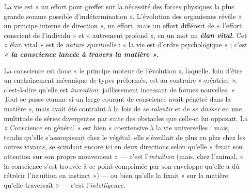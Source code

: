 La vie est « un effort pour greffer sur la nécessité des forces physiques
la plus grande somme possible d’indétermination ». L'évolution des
organismes révèle « un principe interne de direction », un effort, mais
un effort différent de « l'effort conscient de l'individu » et « autrement
profond », en un mot un \textbf{\textit {élan vital.}} Cet « élan vital » est de {\it nature
spirituelle} : « la vie est d’ordre psychologique » ; c’est \textbf{\textit {« la conscience
lancée à travers la matière ».}}

\vspace{0.24cm}
{\footnotesize La conscience est donc « le principe moteur de l’évolution », laquelle,
loin d’être un enchaînement mécanique de types préformés, est au contraire
« créatrice », c’est-à-dire qu'elle est {\it invention}, jaillissement incessant de
formes nouvelles. « Tout se passe comme si un large courant de conscience
avait pénétré dans la matière », mais avait été contraint à la fois de {\it se
ralentir} et de {\it se diviser} en une multitude de séries divergentes par suite des
obstacles que celle-ci lui opposait. La « Conscience en général » est bien
« coextensive à la vie universelles : mais, tandis qu’elle s’assoupissait chez
le végétal, elle s’éveillait de plus en plus chez les autres vivants, se scindant
encore ici en deux directions selon qu’elle « fixait son attention sur son
propre mouvement » — c’est l'{\it intuition} (mais, chez l’animal, « la conscience
s’est trouvée à ce point comprimée par son enveloppe qu’elle a dû rétrécir
l'intuition en instinct ») — ou bien qu'elle la fixait « sur la matière qu’elle
traversait » — c’est l'{\it intelligence}.}
\vspace{0.31cm}

